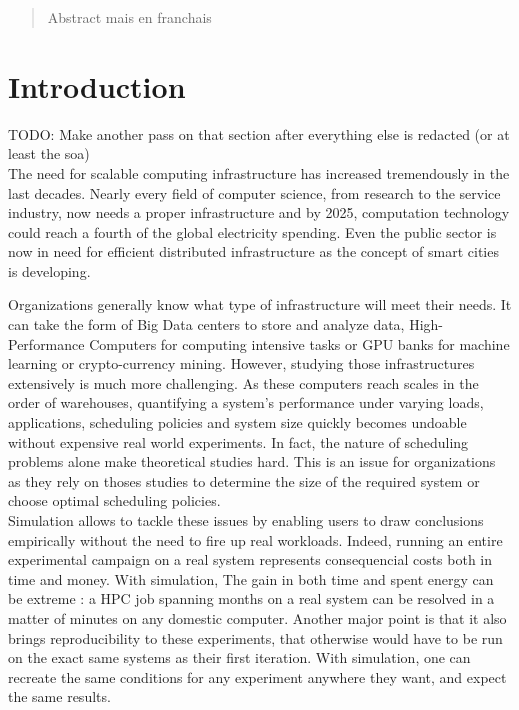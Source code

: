 \documentclass[12pt, a4paper]{memoir}
\begin{document}
\renewcommand\abstractname{R\'esum\'e}
\begin{abstract} 
	Abstract mais en franchais
\end{abstract}

\tableofcontents* %
\normalsize

\mainmatter
\SingleSpace

\chapter{Introduction}

TODO: Make another pass on that section after everything else is redacted (or
at least the soa)\\

The need for scalable computing infrastructure has increased tremendously in
the last decades. Nearly every field of computer science, from research to the
service industry, now needs a proper infrastructure and by 2025, computation
technology could reach a fourth of the global electricity
spending\cite{andrae2017total}.  Even the public sector is now in need for
efficient distributed infrastructure as the concept of smart cities is
developing.

Organizations generally know what type of infrastructure will meet their needs.
It can take the form of Big Data centers to store and analyze data,
High-Performance Computers for computing intensive tasks or GPU banks for
machine learning or crypto-currency mining.  However, studying those
infrastructures extensively is much more challenging.  As these computers reach
scales in the order of warehouses\cite{barroso2018datacenter}, quantifying a
system's performance under varying loads, applications, scheduling policies and
system size quickly becomes undoable without expensive real world experiments.
In fact, the nature of scheduling problems\cite{scheduler-complexity} alone
make theoretical studies hard.  This is an issue for organizations as they rely
on thoses studies to determine the size of the required system or choose
optimal scheduling
policies.\\

Simulation allows to tackle these issues by enabling users to draw conclusions
empirically without the need to fire up real workloads. Indeed, running an
entire experimental campaign on a real system represents consequencial costs
both in time and money. With simulation, The gain in both time and spent energy
can be extreme : a HPC job spanning months on a real system can be resolved in
a matter of minutes on any domestic computer.  Another major point is that it
also brings reproducibility to these experiments, that otherwise would have to
be run on the exact same systems as their first iteration. With simulation, one
can recreate the same conditions for any experiment anywhere they want, and
expect the same results.\\
\end{document}
